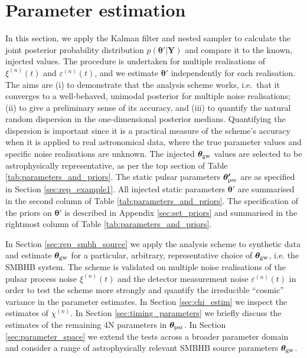 \documentclass[fleqn,usenatbib,useAMS]{mnras}
\begin{document}
 
\section{Parameter estimation} \label{sec:pe_and_ms} 
In this section, we apply the Kalman filter and nested sampler to calculate the joint posterior probability distribution $p({\boldsymbol{\theta'}} | {\boldsymbol{Y}})$ and compare it to the known, injected values. The procedure is undertaken for multiple realisations of $\xi^{(n)}(t)$ and $\varepsilon^{(n)}(t)$, and we estimate $\boldsymbol{\theta'}$ independently for each realisation. The aims are (i) to demonstrate that the analysis scheme works, i.e.\ that it converges to a well-behaved, unimodal posterior for multiple noise realisations; (ii) to give a preliminary sense of its accuracy, and (iii) to quantify the natural random dispersion in the one-dimensional posterior medians. Quantifying the dispersion is important since it is a practical measure of the scheme's accuracy when it is applied to real astronomical data, where the true parameter values and specific noise realisations are unknown. The injected $\boldsymbol{\theta}_{\rm gw}$ values are selected to be astrophysically representative, as per the top section of Table \ref{tab:parameters_and_priors}. The static pulsar parameters $\boldsymbol{\theta'}_{\rm psr}$ are as specified in Section \ref{sec:rep_example1}. All injected static parameters $\boldsymbol{\theta}'$ are summarised in the second column of Table \ref{tab:parameters_and_priors}. The specification of the priors on $\boldsymbol{\theta'}$ is described in Appendix \ref{sec:set_priors} and summarised in the rightmost column of Table \ref{tab:parameters_and_priors}. \newline 

In Section \ref{sec:rep_smbh_source} we apply the analysis scheme to synthetic data and estimate $\boldsymbol{\theta}_{\rm gw}$ for a  particular, arbitrary, representative choice of $\boldsymbol{\theta}_{\rm gw}$, i.e. the SMBHB system. The scheme is validated on multiple noise realisations of the pulsar process noise $\xi^{(n)}(t)$ and the detector measurement noise $\varepsilon^{(n)}(t)$ in order to test the scheme more strongly and quantify the  irreducible ``cosmic'' variance in the parameter estimates. In Section \ref{sec:chi_estim} we inspect the estimates of  $\chi^{(n)}$. In Section \ref{sec:timing_parameters} we briefly discuss the estimates of the remaining 4N parameters in $\boldsymbol{\theta}_{\rm psr}$. In Section \ref{sec:parameter_space} we extend the tests across a broader parameter domain and consider a range of astrophysically relevant SMBHB source parameters $\boldsymbol{\theta}_{\rm gw}$. 
\end{document}
